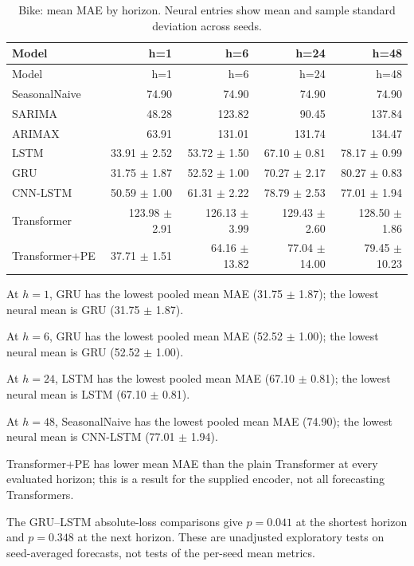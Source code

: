\documentclass[10pt,a4paper]{article}
\begin{document}
\begin{center}\begingroup\footnotesize\setlength{\tabcolsep}{3pt}\begin{longtable}{@{}lrrrr@{}}\caption{Bike: mean MAE by horizon. Neural entries show mean and sample standard deviation across seeds.}\\\toprule Model & h=1 & h=6 & h=24 & h=48\\\midrule\endfirsthead\toprule Model & h=1 & h=6 & h=24 & h=48\\\midrule\endhead SeasonalNaive & 74.90 & 74.90 & 74.90 & 74.90 \\
SARIMA & 48.28 & 123.82 & 90.45 & 137.84 \\
ARIMAX & 63.91 & 131.01 & 131.74 & 134.47 \\
LSTM & 33.91 $\pm$ 2.52 & 53.72 $\pm$ 1.50 & 67.10 $\pm$ 0.81 & 78.17 $\pm$ 0.99 \\
GRU & 31.75 $\pm$ 1.87 & 52.52 $\pm$ 1.00 & 70.27 $\pm$ 2.17 & 80.27 $\pm$ 0.83 \\
CNN-LSTM & 50.59 $\pm$ 1.00 & 61.31 $\pm$ 2.22 & 78.79 $\pm$ 2.53 & 77.01 $\pm$ 1.94 \\
Transformer & 123.98 $\pm$ 2.91 & 126.13 $\pm$ 3.99 & 129.43 $\pm$ 2.60 & 128.50 $\pm$ 1.86 \\
Transformer+PE & 37.71 $\pm$ 1.51 & 64.16 $\pm$ 13.82 & 77.04 $\pm$ 14.00 & 79.45 $\pm$ 10.23 \\\bottomrule\end{longtable}\endgroup\end{center}
At $h=1$, GRU has the lowest pooled mean MAE (31.75 $\pm$ 1.87); the lowest neural mean is GRU (31.75 $\pm$ 1.87).

At $h=6$, GRU has the lowest pooled mean MAE (52.52 $\pm$ 1.00); the lowest neural mean is GRU (52.52 $\pm$ 1.00).

At $h=24$, LSTM has the lowest pooled mean MAE (67.10 $\pm$ 0.81); the lowest neural mean is LSTM (67.10 $\pm$ 0.81).

At $h=48$, SeasonalNaive has the lowest pooled mean MAE (74.90); the lowest neural mean is CNN-LSTM (77.01 $\pm$ 1.94).

Transformer+PE has lower mean MAE than the plain Transformer at every evaluated horizon; this is a result for the supplied encoder, not all forecasting Transformers.

The GRU--LSTM absolute-loss comparisons give $p=0.041$ at the shortest horizon and $p=0.348$ at the next horizon. These are unadjusted exploratory tests on seed-averaged forecasts, not tests of the per-seed mean metrics.
\end{document}

